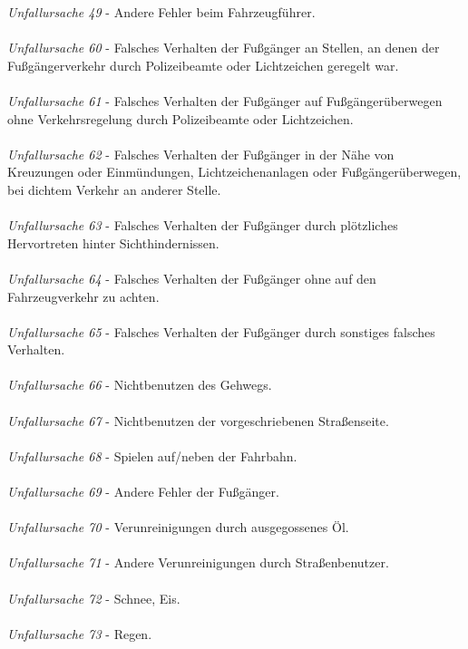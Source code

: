 \textit{Unfallursache 49} - Andere Fehler beim Fahrzeugführer.\\
\\
\textit{Unfallursache 60} - Falsches Verhalten der Fußgänger an Stellen, an denen der Fußgängerverkehr durch Polizeibeamte oder Lichtzeichen geregelt war.\\
\\
\textit{Unfallursache 61} - Falsches Verhalten der Fußgänger auf Fußgängerüberwegen ohne Verkehrsregelung durch Polizeibeamte oder Lichtzeichen.\\
\\
\textit{Unfallursache 62} - Falsches Verhalten der Fußgänger in der Nähe von Kreuzungen oder Einmündungen, Lichtzeichenanlagen oder Fußgängerüberwegen, bei dichtem Verkehr an anderer Stelle.\\
\\
\textit{Unfallursache 63} - Falsches Verhalten der Fußgänger durch plötzliches Hervortreten hinter Sichthindernissen.\\
\\
\textit{Unfallursache 64} - Falsches Verhalten der Fußgänger ohne auf den Fahrzeugverkehr zu achten.\\
\\
\textit{Unfallursache 65} - Falsches Verhalten der Fußgänger durch sonstiges falsches Verhalten.\\
\\
\textit{Unfallursache 66} - Nichtbenutzen des Gehwegs.\\
\\
\textit{Unfallursache 67} - Nichtbenutzen der vorgeschriebenen Straßenseite.\\
\\
\textit{Unfallursache 68} - Spielen auf/neben der Fahrbahn.\\
\\
\textit{Unfallursache 69} - Andere Fehler der Fußgänger.\\
\\
\textit{Unfallursache 70} - Verunreinigungen durch ausgegossenes Öl.\\
\\
\textit{Unfallursache 71} - Andere Verunreinigungen durch Straßenbenutzer.\\
\\
\textit{Unfallursache 72} - Schnee, Eis.\\
\\
\textit{Unfallursache 73} - Regen.\\
\\
